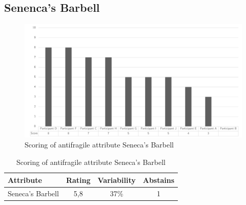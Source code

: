 \subsection{Senenca's Barbell}
\begin{figure}[H]
	\centering
	\includegraphics[width=0.9\linewidth]{images/scoreafseneca}
	\caption[Scoring of antifragile attribute Seneca's Barbell]{Scoring of antifragile attribute Seneca's Barbell}
	\label{fig:appscoringafseneca}
\end{figure}
\begin{table}[H]
	\centering
	\begin{tabular}{p{}ccc}
		\toprule
		\textbf{Attribute} & \textbf{Rating} & \textbf{Variability} & \textbf{Abstains} \\
		\midrule
		Seneca's Barbell & 5,8 & 37\% & 1 \\%
		\bottomrule
	\end{tabular}%
	\caption[Scoring of antifragile attribute Seneca's Barbell]{Scoring of antifragile attribute Seneca's Barbell}
	\label{tab:appscoringafseneca}%
\end{table}%
\newpage
